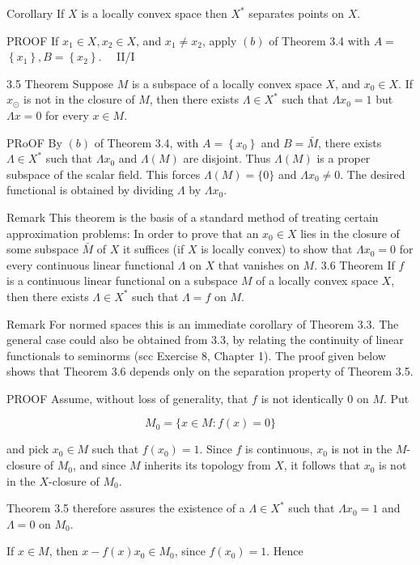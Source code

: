 \documentclass[10pt]{article}
\begin{document}
Corollary If $X$ is a locally convex space then $X^{*}$ separates points on $X$.

PROOF If $x_{1} \in X, x_{2} \in X$, and $x_{1} \neq x_{2}$, apply $(b)$ of Theorem 3.4 with $A=$ $\left\{x_{1}\right\}, B=\left\{x_{2}\right\} . \quad$ II/I

3.5 Theorem Suppose $M$ is a subspace of a locally convex space $X$, and $x_{0} \in X$. If $x_{\odot}$ is not in the closure of $M$, then there exists $\Lambda \in X^{*}$ such that $\Lambda x_{0}=1$ but $\Lambda x=0$ for every $x \in M$.

PRoOF By $(b)$ of Theorem 3.4, with $A=\left\{x_{0}\right\}$ and $B=\bar{M}$, there exists $\Lambda \in X^{*}$ such that $\Lambda x_{0}$ and $\Lambda(M)$ are disjoint. Thus $\Lambda(M)$ is a proper subspace of the scalar field. This forces $\Lambda(M)=\{0\}$ and $\Lambda x_{0} \neq 0$. The desired functional is obtained by dividing $\Lambda$ by $\Lambda x_{0}$.

Remark This theorem is the basis of a standard method of treating certain approximation problems: In order to prove that an $x_{0} \in X$ lies in the closure of some subspace $\bar{M}$ of $X$ it suffices (if $X$ is locally convex) to show that $\Lambda x_{0}=0$ for every continuous linear functional $\Lambda$ on $X$ that vanishes on $M$. 3.6 Theorem If $f$ is a continuous linear functional on a subspace $M$ of a locally
convex space $X$, then there exists $\Lambda \in X^{*}$ such that $\Lambda=f$ on $M$.

Remark For normed spaces this is an immediate corollary of Theorem 3.3. The general case could also be obtained from 3.3, by relating the continuity
of linear functionals to seminorms (scc Exercise 8, Chapter 1). The proof given below shows that Theorem 3.6 depends only on the separation property of Theorem 3.5.

PROOF Assume, without loss of generality, that $f$ is not identically 0 on $M$. Put

$$
M_{0}=\{x \in M: f(x)=0\}
$$

and pick $x_{0} \in M$ such that $f\left(x_{0}\right)=1$. Since $f$ is continuous, $x_{0}$ is not in the $M$-closure of $M_{0}$, and since $M$ inherits its topology from $X$, it follows that $x_{0}$ is not in the $X$-closure of $M_{0}$.

Theorem 3.5 therefore assures the existence of a $\Lambda \in X^{*}$ such that $\Lambda x_{0}=1$ and $\Lambda=0$ on $M_{0}$.

If $x \in M$, then $x-f(x) x_{0} \in M_{0}$, since $f\left(x_{0}\right)=1$. Hence
\end{document}
